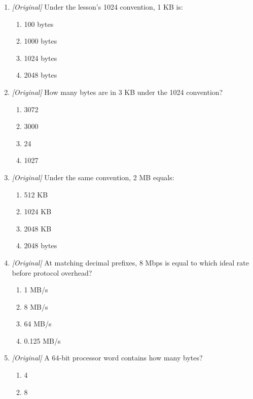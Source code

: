 \begin{enumerate}[label=\textbf{Q\arabic*.}, leftmargin=*]
  amount?
  \begin{enumerate}[label=\Alph*.]
    \item 20 MB
    \item 20 GB
    \item 20 Mbps
    \item 20 bytes
  \end{enumerate}
\item \textit{[Original]} Under the lesson's 1024 convention, 1 KB is:
  \begin{enumerate}[label=\Alph*.]
    \item 100 bytes
    \item 1000 bytes
    \item 1024 bytes
    \item 2048 bytes
  \end{enumerate}
\item \textit{[Original]} How many bytes are in 3 KB under the 1024
  convention?
  \begin{enumerate}[label=\Alph*.]
    \item 3072
    \item 3000
    \item 24
    \item 1027
  \end{enumerate}
\item \textit{[Original]} Under the same convention, 2 MB equals:
  \begin{enumerate}[label=\Alph*.]
    \item 512 KB
    \item 1024 KB
    \item 2048 KB
    \item 2048 bytes
  \end{enumerate}
\item \textit{[Original]} At matching decimal prefixes, 8 Mbps is equal to
  which ideal rate before protocol overhead?
  \begin{enumerate}[label=\Alph*.]
    \item 1 MB/s
    \item 8 MB/s
    \item 64 MB/s
    \item 0.125 MB/s
  \end{enumerate}
\item \textit{[Original]} A 64-bit processor word contains how many bytes?
  \begin{enumerate}[label=\Alph*.]
    \item 4
    \item 8

\end{enumerate}
\end{enumerate}
